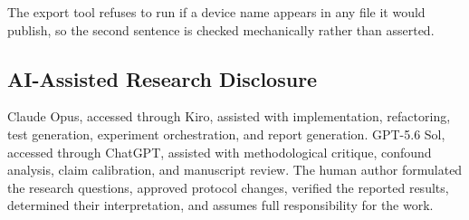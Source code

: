 The export tool refuses to run if a device name appears in any file it would publish, so
the second sentence is checked mechanically rather than asserted.

\subsection*{AI-Assisted Research Disclosure}

Claude Opus, accessed through Kiro, assisted with implementation, refactoring, test
generation, experiment orchestration, and report generation. GPT-5.6 Sol, accessed
through ChatGPT, assisted with methodological critique, confound analysis, claim
calibration, and manuscript review. The human author formulated the research
questions, approved protocol changes, verified the reported results, determined
their interpretation, and assumes full responsibility for the work.
